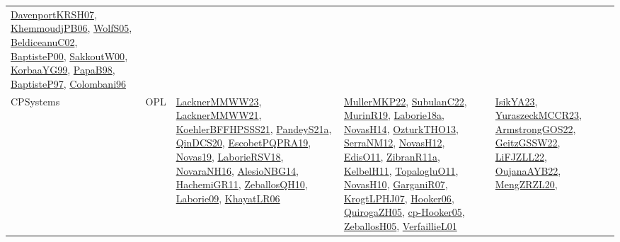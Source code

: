 {\begin{longtable}{lp{3cm}>{\raggedright}p{6cm}>{\raggedright}p{6cm}p{8cm}}
\href{papers/DavenportKRSH07.pdf}{DavenportKRSH07}\cite{DavenportKRSH07}, \href{papers/KhemmoudjPB06.pdf}{KhemmoudjPB06}\cite{KhemmoudjPB06}, \href{papers/WolfS05.pdf}{WolfS05}\cite{WolfS05}, \href{papers/BeldiceanuC02.pdf}{BeldiceanuC02}\cite{BeldiceanuC02}, \href{articles/BaptisteP00.pdf}{BaptisteP00}\cite{BaptisteP00}, \href{articles/SakkoutW00.pdf}{SakkoutW00}\cite{SakkoutW00}, \href{papers/KorbaaYG99.pdf}{KorbaaYG99}\cite{KorbaaYG99}, \href{articles/PapaB98.pdf}{PapaB98}\cite{PapaB98}, \href{papers/BaptisteP97.pdf}{BaptisteP97}\cite{BaptisteP97}, \href{papers/Colombani96.pdf}{Colombani96}\cite{Colombani96}\\
CPSystems & OPL & \href{articles/LacknerMMWW23.pdf}{LacknerMMWW23}\cite{LacknerMMWW23}, \href{papers/LacknerMMWW21.pdf}{LacknerMMWW21}\cite{LacknerMMWW21}, \href{articles/KoehlerBFFHPSSS21.pdf}{KoehlerBFFHPSSS21}\cite{KoehlerBFFHPSSS21}, \href{articles/PandeyS21a.pdf}{PandeyS21a}\cite{PandeyS21a}, \href{articles/QinDCS20.pdf}{QinDCS20}\cite{QinDCS20}, \href{articles/EscobetPQPRA19.pdf}{EscobetPQPRA19}\cite{EscobetPQPRA19}, \href{articles/Novas19.pdf}{Novas19}\cite{Novas19}, \href{articles/LaborieRSV18.pdf}{LaborieRSV18}\cite{LaborieRSV18}, \href{articles/NovaraNH16.pdf}{NovaraNH16}\cite{NovaraNH16}, \href{papers/AlesioNBG14.pdf}{AlesioNBG14}\cite{AlesioNBG14}, \href{articles/HachemiGR11.pdf}{HachemiGR11}\cite{HachemiGR11}, \href{articles/ZeballosQH10.pdf}{ZeballosQH10}\cite{ZeballosQH10}, \href{papers/Laborie09.pdf}{Laborie09}\cite{Laborie09}, \href{articles/KhayatLR06.pdf}{KhayatLR06}\cite{KhayatLR06} & \href{articles/MullerMKP22.pdf}{MullerMKP22}\cite{MullerMKP22}, \href{articles/SubulanC22.pdf}{SubulanC22}\cite{SubulanC22}, \href{papers/MurinR19.pdf}{MurinR19}\cite{MurinR19}, \href{papers/Laborie18a.pdf}{Laborie18a}\cite{Laborie18a}, \href{articles/NovasH14.pdf}{NovasH14}\cite{NovasH14}, \href{articles/OzturkTHO13.pdf}{OzturkTHO13}\cite{OzturkTHO13}, \href{papers/SerraNM12.pdf}{SerraNM12}\cite{SerraNM12}, \href{articles/NovasH12.pdf}{NovasH12}\cite{NovasH12}, \href{papers/EdisO11.pdf}{EdisO11}\cite{EdisO11}, \href{papers/ZibranR11a.pdf}{ZibranR11a}\cite{ZibranR11a}, \href{articles/KelbelH11.pdf}{KelbelH11}\cite{KelbelH11}, \href{articles/TopalogluO11.pdf}{TopalogluO11}\cite{TopalogluO11}, \href{articles/NovasH10.pdf}{NovasH10}\cite{NovasH10}, \href{papers/GarganiR07.pdf}{GarganiR07}\cite{GarganiR07}, \href{papers/KrogtLPHJ07.pdf}{KrogtLPHJ07}\cite{KrogtLPHJ07}, \href{articles/Hooker06.pdf}{Hooker06}\cite{Hooker06}, \href{papers/QuirogaZH05.pdf}{QuirogaZH05}\cite{QuirogaZH05}, \href{papers/cp-Hooker05.pdf}{cp-Hooker05}\cite{cp-Hooker05}, \href{articles/ZeballosH05.pdf}{ZeballosH05}\cite{ZeballosH05}, \href{papers/VerfaillieL01.pdf}{VerfaillieL01}\cite{VerfaillieL01} & \href{articles/IsikYA23.pdf}{IsikYA23}\cite{IsikYA23}, \href{articles/YuraszeckMCCR23.pdf}{YuraszeckMCCR23}\cite{YuraszeckMCCR23}, \href{papers/ArmstrongGOS22.pdf}{ArmstrongGOS22}\cite{ArmstrongGOS22}, \href{papers/GeitzGSSW22.pdf}{GeitzGSSW22}\cite{GeitzGSSW22}, \href{papers/LiFJZLL22.pdf}{LiFJZLL22}\cite{LiFJZLL22}, \href{papers/OujanaAYB22.pdf}{OujanaAYB22}\cite{OujanaAYB22}, \href{articles/MengZRZL20.pdf}{MengZRZL20}\cite{MengZRZL20}, 
\end{longtable}}
